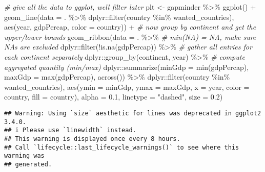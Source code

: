 \documentclass[
  oneside]{book}
\newenvironment{Shaded}{\begin{snugshade}}{\end{snugshade}}
\newcommand{\AttributeTok}[1]{\textcolor[rgb]{0.77,0.63,0.00}{#1}}
\newcommand{\CommentTok}[1]{\textcolor[rgb]{0.56,0.35,0.01}{\textit{#1}}}
\newcommand{\FloatTok}[1]{\textcolor[rgb]{0.00,0.00,0.81}{#1}}
\newcommand{\FunctionTok}[1]{\textcolor[rgb]{0.00,0.00,0.00}{#1}}
\newcommand{\NormalTok}[1]{#1}
\newcommand{\OtherTok}[1]{\textcolor[rgb]{0.56,0.35,0.01}{#1}}
\newcommand{\SpecialCharTok}[1]{\textcolor[rgb]{0.00,0.00,0.00}{#1}}
\newcommand{\StringTok}[1]{\textcolor[rgb]{0.31,0.60,0.02}{#1}}
\begin{document}
\begin{Shaded}
\begin{Highlighting}[]
\CommentTok{\# give all the data to ggplot, we\textquotesingle{}ll filter later}
\NormalTok{plt }\OtherTok{\textless{}{-}}\NormalTok{ gapminder }\SpecialCharTok{\%\textgreater{}\%}
  \FunctionTok{ggplot}\NormalTok{() }\SpecialCharTok{+}
    \FunctionTok{geom\_line}\NormalTok{(}\AttributeTok{data =}\NormalTok{ . }\SpecialCharTok{\%\textgreater{}\%}
\NormalTok{      dplyr}\SpecialCharTok{::}\FunctionTok{filter}\NormalTok{(country }\SpecialCharTok{\%in\%}\NormalTok{ wanted\_countries),}
              \FunctionTok{aes}\NormalTok{(year, gdpPercap, }\AttributeTok{color =}\NormalTok{ country)) }\SpecialCharTok{+}
    \CommentTok{\# now group by continent and get the upper/lower bounds}
    \FunctionTok{geom\_ribbon}\NormalTok{(}\AttributeTok{data =}\NormalTok{ . }\SpecialCharTok{\%\textgreater{}\%}
      \CommentTok{\# min(NA) = NA, make sure NAs are excluded}
\NormalTok{      dplyr}\SpecialCharTok{::}\FunctionTok{filter}\NormalTok{(}\SpecialCharTok{!}\FunctionTok{is.na}\NormalTok{(gdpPercap)) }\SpecialCharTok{\%\textgreater{}\%}
      \CommentTok{\# gather all entries for each continent separately}
\NormalTok{      dplyr}\SpecialCharTok{::}\FunctionTok{group\_by}\NormalTok{(continent, year) }\SpecialCharTok{\%\textgreater{}\%}
      \CommentTok{\# compute aggregated quantity (min/max)}
\NormalTok{      dplyr}\SpecialCharTok{::}\FunctionTok{summarize}\NormalTok{(}\AttributeTok{minGdp =} \FunctionTok{min}\NormalTok{(gdpPercap),}
                       \AttributeTok{maxGdp =} \FunctionTok{max}\NormalTok{(gdpPercap), }\FunctionTok{across}\NormalTok{()) }\SpecialCharTok{\%\textgreater{}\%}
\NormalTok{      dplyr}\SpecialCharTok{::}\FunctionTok{filter}\NormalTok{(country }\SpecialCharTok{\%in\%}\NormalTok{ wanted\_countries),}
              \FunctionTok{aes}\NormalTok{(}\AttributeTok{ymin =}\NormalTok{ minGdp, }\AttributeTok{ymax =}\NormalTok{ maxGdp,}
                  \AttributeTok{x =}\NormalTok{ year, }\AttributeTok{color =}\NormalTok{ country, }\AttributeTok{fill =}\NormalTok{ country),}
              \AttributeTok{alpha =} \FloatTok{0.1}\NormalTok{, }\AttributeTok{linetype =} \StringTok{"dashed"}\NormalTok{, }\AttributeTok{size =} \FloatTok{0.2}\NormalTok{)}
\end{Highlighting}
\end{Shaded}

\begin{verbatim}
## Warning: Using `size` aesthetic for lines was deprecated in ggplot2 3.4.0.
## i Please use `linewidth` instead.
## This warning is displayed once every 8 hours.
## Call `lifecycle::last_lifecycle_warnings()` to see where this warning was
## generated.
\end{verbatim}
\end{document}

